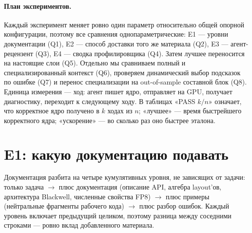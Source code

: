 \documentclass[10pt,a4paper]{article}
\begin{document}
\paragraph{План экспериментов.} Каждый эксперимент меняет ровно один параметр относительно
общей опорной конфигурации, поэтому все сравнения однопараметрические: E1 --- уровни
документации (Q1), E2 --- способ доставки того же материала (Q2), E3 --- агент-рецензент
(Q3), E4 --- сводка профилировщика (Q4). Затем лучшее переносится на настоящие слои (Q5). Отдельно мы сравниваем полный и специализированный контекст (Q6), проверяем
динамический выбор подсказок по ошибке (Q7) и перенос специализации на
out-of-sample составной блок (Q8).
Единица измерения --- ход: агент пишет ядро, отправляет на GPU, получает диагностику,
переходит к следующему ходу. В таблицах «PASS $k/n$» означает, что корректное ядро получено
в $k$ ходах из $n$; «лучшее» --- время быстрейшего корректного ядра; «ускорение» --- во
сколько раз оно быстрее эталона.

\section{E1: какую документацию подавать}
\label{sec:e1}

Документация разбита на четыре кумулятивных уровня, не зависящих от задачи: только задача
$\to$ плюс документация (описание API, алгебра layout'ов, архитектура Blackwell, численные
свойства FP8) $\to$ плюс примеры (нейтральные фрагменты рабочего кода) $\to$ плюс разбор
ошибок. Каждый уровень включает предыдущий целиком, поэтому разница между соседними строками
--- ровно вклад добавленного материала.
\end{document}
